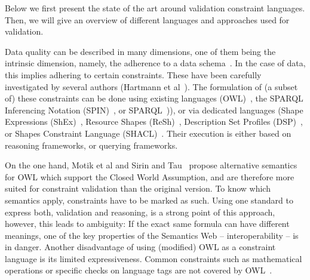 Below
we first present the state of the art around validation constraint languages.
Then, we will give an overview
of different languages and approaches used for \rdf validation.


Data quality can be described in many dimensions,
one of them being the intrinsic dimension, namely,
the adherence to a data schema~\cite{zaveri2015quality}.
In the case of \rdf data, this implies adhering to certain constraints.
These have been carefully investigated by several authors (\eg Hartmann et al~\cite{hartmann2016}).
The formulation of (a subset of) these constraints can be done using existing languages (\eg OWL)~\cite{owl}, 
the SPARQL Inferencing Notation (SPIN)~\cite{Knublauch2011}, or SPARQL~\cite{sparql})),
or via dedicated languages
(\eg Shape Expressions (ShEx)~\cite{shex}, Resource Shapes (ReSh)~\cite{resh}, Description Set Profiles (DSP)~\cite{dsp}, 
or Shapes Constraint Language (SHACL)~\cite{shacl}.
Their execution is either based on reasoning frameworks, or querying frameworks.

On the one hand, Motik et al \cite{motik2007adding} and Sirin and Tau~\cite{sirin2009towards}
propose alternative semantics for OWL
which support the Closed World Assumption,
and are therefore more suited for constraint validation than the original version.
To know which semantics apply,
constraints have to be marked as such.
Using one standard to express both, validation and reasoning,
is a strong point of this approach,
however,  this leads to ambiguity: %
%
If the exact same formula can have different meanings, one of the key properties of the Semantics Web -- interoperability -- is in danger.
Another disadvantage of using (modified) OWL as a constraint language
is its limited expressiveness. 
Common constraints such as mathematical operations
or specific checks on language tags
are not covered by OWL~\cite{hartmann2016}.

